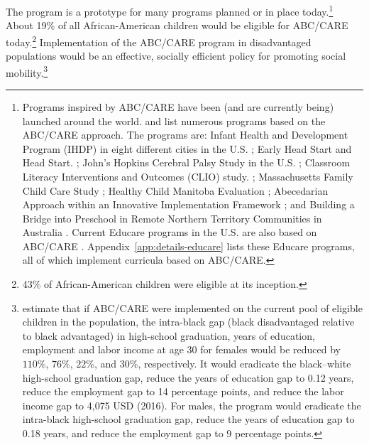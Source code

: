 The program is a prototype for many programs planned or in place today.\footnote{Programs inspired by ABC/CARE have been (and are currently being) launched around the world. \citet{Sparling_2010_Highlights} and \citet{Ramey_Ramey_Lanzi_2014_Interventions} list numerous programs based on the ABC/CARE approach. The programs are: Infant Health and Development Program (IHDP) in eight different cities in the U.S. \citep{Spiker-etal_1997_Helping}; Early Head Start and Head Start. \citep{Schneider_McDonald-eds_2007_Scale-Up_Vol-1}; John's Hopkins Cerebral Palsy Study in the U.S. \citep{Sparling_2010_Highlights}; Classroom Literacy Interventions and Outcomes (CLIO) study. \citep{Sparling_2010_Highlights}; Massachusetts Family Child Care Study \citep{Collins_etal_2010_Massachusetts-Study}; Healthy Child Manitoba Evaluation \citep{Healthy_Child_Manitoba_2015_Starting-Early}; Abecedarian Approach within an Innovative Implementation Framework \citep{Jensen_Nielsen_2016_ABC-Programme-Pilot}; and Building a Bridge into Preschool in Remote Northern Territory Communities in Australia \citep{UMonash_Dataset_2015_URL}. Current Educare programs in the U.S. are also based on ABC/CARE \citep{Educare_2014_Research_Agenda,Yazejian_Bryant_2012_Educare}. Appendix~\ref{app:details-educare} lists these Educare programs, all of which implement curricula based on ABC/CARE.} About 19\% of all African-American children would be eligible for ABC/CARE today.\footnote{43\% of African-American children were eligible at its inception.} Implementation of the ABC/CARE program in disadvantaged populations would be an effective, socially efficient policy for promoting social mobility.\footnote{\citet{Garcia_2016_National-Implementation-ECI} estimate that if ABC/CARE were implemented on the current pool of eligible children in the population, the intra-black gap (black disadvantaged relative to black advantaged) in high-school graduation, years of education, employment and labor income at age 30 for females would be reduced by $110\%$, $76\%$, $22\%$, and $30\%$, respectively. It would eradicate the black--white high-school graduation gap, reduce the years of education gap to 0.12 years, reduce the employment gap to 14 percentage points, and reduce the labor income gap to 4,075 USD (2016). For males, the program would eradicate the intra-black high-school graduation gap, reduce the years of education gap to 0.18 years, and reduce the employment gap to 9 percentage points.}


